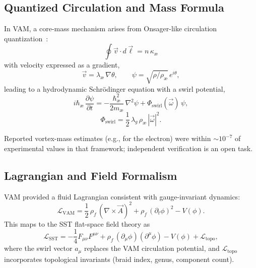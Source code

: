 \documentclass[11pt]{article}
\newcommand{\rhof}{\rho_{\!f}}                           %
\begin{document}
    \subsection{Quantized Circulation and Mass Formula}

        In VAM, a core-mass mechanism arises from Onsager-like circulation quantization~\cite{onsager1949,feynman1955}:
        \begin{equation}
            \oint \vec{v} \cdot d\vec{\ell} = n \, \kappa_\text{\ae}
        \end{equation}
        with velocity expressed as a gradient,
        \begin{equation}
            \vec{v} = \lambda_\text{\ae} \, \nabla \theta, \qquad \psi = \sqrt{\rho/\rho_\text{\ae}}\, e^{i\theta},
        \end{equation}
        leading to a hydrodynamic Schrödinger equation with a swirl potential,
        \begin{equation}
            i\hbar_\text{\ae} \, \frac{\partial \psi}{\partial t} = -\frac{\hbar_\text{\ae}^2}{2m_\text{\ae}} \, \nabla^2 \psi + \Phi_{\text{swirl}}(\vec{\omega})\, \psi,
        \end{equation}
        \begin{equation}
            \Phi_{\text{swirl}} = \frac{1}{2} \, \lambda_g \, \rho_\text{\ae} \, |\vec{\omega}|^2.
        \end{equation}

        Reported vortex-mass estimates (e.g., for the electron) were within $\sim 10^{-7}$ of experimental values in that framework; independent verification is an open task.

    \subsection{Lagrangian and Field Formalism}

        VAM provided a fluid Lagrangian consistent with gauge-invariant dynamics:
        \begin{equation}
            \mathcal{L}_\text{VAM} = \frac{1}{2} \, \rhof \, (\nabla \times \vec{A})^2 + \rhof \, (\partial_t \phi)^2 - V(\phi).
        \end{equation}
        This maps to the SST flat-space field theory as
        \begin{equation}
            \mathcal{L}_\text{SST} = -\frac{1}{4} F_{\mu\nu} F^{\mu\nu} + \rhof \, (\partial_\mu \phi)(\partial^\mu \phi) - V(\phi) + \mathcal{L}_{\text{topo}},
        \end{equation}
        where the swirl vector $a_\mu$ replaces the VAM circulation potential, and $\mathcal{L}_{\text{topo}}$ incorporates topological invariants (braid index, genus, component count).
\end{document}

